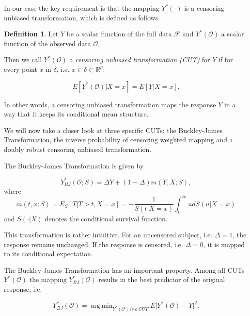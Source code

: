 \documentclass[12pt, a4paper]{article}
\theoremstyle{definition}
\newtheorem{Definition}{Definition}[section]
\theoremstyle{plain}
\numberwithin{equation}{section}
\numberwithin{figure}{section}
\numberwithin{table}{section}
\DeclareMathOperator*{\argmin}{arg\,min}
\begin{document}
	In our case the key requirement is that the mapping $Y^*(\cdot)$ is a censoring unbiased transformation, which is defined as follows.
	
	\begin{Definition}
	Let $Y$ be a scalar function of the full data $\mathcal{F}$ and $Y^*(\mathcal{O})$ a scalar function of the observed data $\mathcal{O}$.
	
	Then we call $Y^*(\mathcal{O})$ a \textit{censoring unbiased transformation (CUT)} for $Y$ if for every point $x$ in $\delta$, i.e. $x \in \delta \subset \mathbb{R}^p$:

	\begin{equation*}
	E[Y^*(\mathcal{O}) \vert X = x] = E[Y \vert X=x].
	\end{equation*}
	\end{Definition}

	In other words, a censoring unbiased transformation maps the response $Y$ in a way that it keeps its conditional mean structure.
	
	We will now take a closer look at three specific CUTs: the Buckley-James Transformation, the inverse probability of censoring weighted mapping and a doubly robust censoring unbiased transformation.
	
	The Buckley-James Transformation is given by
	
	\begin{equation}\label{eq:bjtrafo}
		Y_{BJ}^* (\mathcal{O}; S) = \Delta Y + (1-\Delta)m(Y,X;S),
	\end{equation}
	where
	\begin{equation}\label{eq:condmean}
		m(t,x;S) = E_S[T \vert T > t, X=x] = -\frac{1}{S(t\vert X=x)} \int_t^{\infty} u dS(u\vert X=x)
	\end{equation}%
	and $S(\cdot\vert X)$ denotes the conditional survival function.
	
	This transformation is rather intuitive.
	For an uncensored subject, i.e. $\Delta = 1$, the response remains unchanged.
	If the response is censored, i.e. $\Delta = 0$, it is mapped to its conditional expectation. %
	
	
	The Buckley-James Transformation has an important property.
	Among all CUTs $Y^*(\mathcal{O})$ the mapping $Y_{BJ}^* (\mathcal{O})$ results in the best predictor of the original response, i.e.
	
	\begin{equation*}
	Y_{BJ}^* (\mathcal{O})= \argmin_{Y^*(\mathcal{O})~is~a~CUT} E \vert Y^*(\mathcal{O}) - Y \vert ^2.
	\end{equation*}
	
\end{document}
